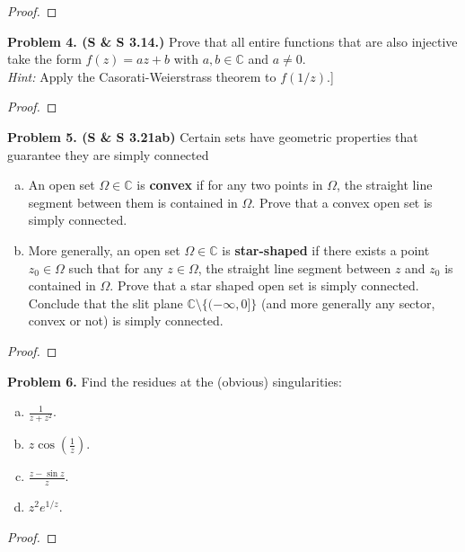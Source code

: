 \documentclass[leqno]{article}
\theoremstyle{nonumberplain}
\newtheorem{proof}{Proof}
\begin{document}
\begin{proof}
\end{proof}

\vspace*{1cm}

\noindent\textbf{Problem 4. (S \& S 3.14.)} Prove that all entire functions that are also injective take the form $f(z)=az+b$ with $a,b\in \mathbb{C}$ and $a\neq 0$.\\
\noindent\emph{Hint:} Apply the Casorati-Weierstrass theorem to $f(1/z)$.]


\begin{proof}
\end{proof}


\vspace*{1cm}

\noindent\textbf{Problem 5. (S \& S 3.21ab)}  Certain sets have geometric properties that guarantee they are simply connected
\begin{enumerate}[(a)]
\item An open set $\Omega\in \mathbb{C}$ is \textbf{convex} if for any two points in $\Omega$, the straight line segment between them is contained in $\Omega$. Prove that a convex open set is simply connected.
\item More generally, an open set $\Omega \in \mathbb{C}$ is \textbf{star-shaped} if there exists a point $z_0\in \Omega$ such that for any $z\in \Omega$, the straight line segment between $z$ and $z_0$ is contained in $\Omega$. Prove that a star shaped open set is simply connected. Conclude that the slit plane $\mathbb{C}\setminus \{(-\infty,0]\}$ (and more generally any sector, convex or not) is simply connected.
\end{enumerate}

\begin{proof}
\end{proof}

\vspace*{1cm}

\noindent\textbf{Problem 6.} Find the residues at the (obvious) singularities:
\begin{enumerate}[(a)]
\item $\frac{1}{z+z^2}$.
\item $z\cos \left( \frac{1}{z}\right)$.
\item $\frac{z-\sin z}{z}$.
\item $z^2e^{1/z}$.
\end{enumerate} 


\begin{proof}
\end{proof}
\end{document}
